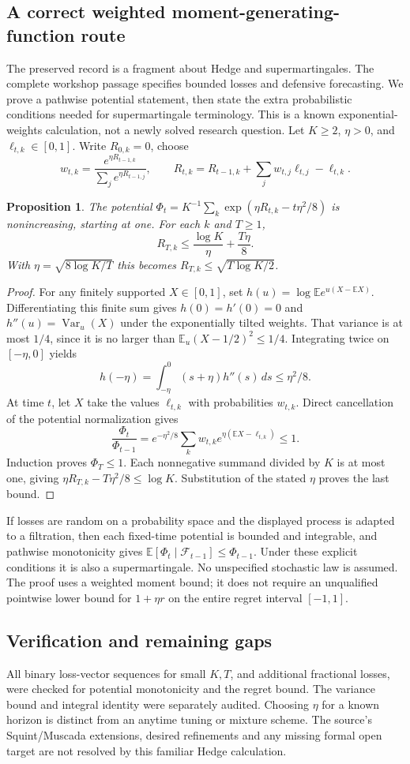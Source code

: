 \documentclass[11pt]{article}
\newtheorem{proposition}{Proposition}
\begin{document}
\subsection{A correct weighted moment-generating-function route}
The preserved record is a fragment about Hedge and supermartingales. The complete workshop passage specifies bounded losses and defensive forecasting. We prove a pathwise potential statement, then state the extra probabilistic conditions needed for supermartingale terminology. This is a known exponential-weights calculation, not a newly solved research question.
Let $K\ge2$, $\eta>0$, and $\ell_{t,k}\in[0,1]$. Write $R_{0,k}=0$, choose
\[
w_{t,k}=\frac{e^{\eta R_{t-1,k}}}{\sum_j e^{\eta R_{t-1,j}}},\qquad
R_{t,k}=R_{t-1,k}+\sum_jw_{t,j}\ell_{t,j}-\ell_{t,k}.
\]
\begin{proposition}
The potential $\Phi_t=K^{-1}\sum_k\exp(\eta R_{t,k}-t\eta^2/8)$ is nonincreasing, starting at one. For each $k$ and $T\ge1$,
\[
R_{T,k}\le\frac{\log K}{\eta}+\frac{T\eta}{8}.
\]
With $\eta=\sqrt{8\log K/T}$ this becomes $R_{T,k}\le\sqrt{T\log K/2}$.
\end{proposition}
\begin{proof}
For any finitely supported $X\in[0,1]$, set $h(u)=\log\mathbb E e^{u(X-\mathbb EX)}$. Differentiating this finite sum gives $h(0)=h'(0)=0$ and $h''(u)=\operatorname{Var}_u(X)$ under the exponentially tilted weights. That variance is at most $1/4$, since it is no larger than $\mathbb E_u(X-1/2)^2\le1/4$. Integrating twice on $[-\eta,0]$ yields
\[
h(-\eta)=\int_{-\eta}^0(s+\eta)h''(s)\,ds\le\eta^2/8.
\]
At time $t$, let $X$ take the values $\ell_{t,k}$ with probabilities $w_{t,k}$. Direct cancellation of the potential normalization gives
\[
\frac{\Phi_t}{\Phi_{t-1}}
=e^{-\eta^2/8}\sum_kw_{t,k}e^{\eta(\mathbb EX-\ell_{t,k})}
\le1.
\]
Induction proves $\Phi_T\le1$. Each nonnegative summand divided by $K$ is at most one, giving $\eta R_{T,k}-T\eta^2/8\le\log K$. Substitution of the stated $\eta$ proves the last bound.
\end{proof}
If losses are random on a probability space and the displayed process is adapted to a filtration, then each fixed-time potential is bounded and integrable, and pathwise monotonicity gives $\mathbb E[\Phi_t\mid\mathcal F_{t-1}]\le\Phi_{t-1}$. Under these explicit conditions it is also a supermartingale. No unspecified stochastic law is assumed. The proof uses a weighted moment bound; it does not require an unqualified pointwise lower bound for $1+\eta r$ on the entire regret interval $[-1,1]$.
\subsection{Verification and remaining gaps}
All binary loss-vector sequences for small $K,T$, and additional fractional losses, were checked for potential monotonicity and the regret bound. The variance bound and integral identity were separately audited. Choosing $\eta$ for a known horizon is distinct from an anytime tuning or mixture scheme. The source's Squint/Muscada extensions, desired refinements and any missing formal open target are not resolved by this familiar Hedge calculation.
\end{document}
